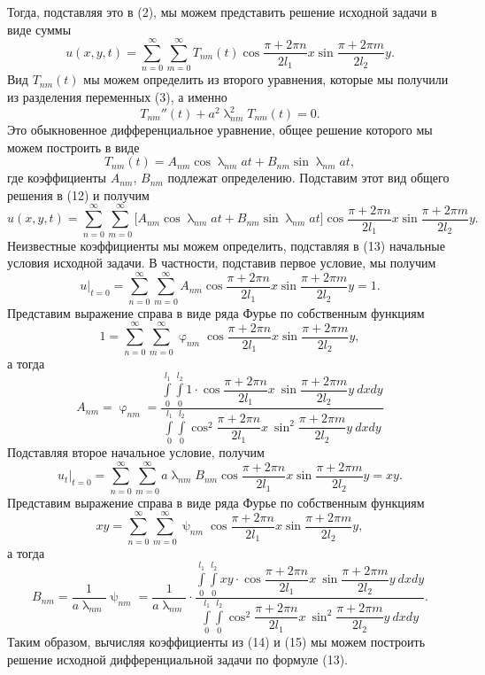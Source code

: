 \documentclass[a4paper, 12pt]{report}
\numberwithin{equation}{section}
\renewcommand{\varphi}{\upvarphi}
\renewcommand{\lambda}{\uplambda}
\renewcommand{\psi}{\uppsi}
\begin{document}
	Тогда, подставляя это в (2), мы можем представить решение исходной задачи в виде суммы
	\begin{equation}
		u(x,y,t) = \sum_{n=0}^{\infty}\sum_{m=0}^{\infty}T_{nm}(t)\cos \dfrac{\pi + 2\pi n}{2l_1}x\sin \dfrac{\pi + 2\pi m}{2l_2}y.
	\end{equation}
	Вид $T_{nm}(t)$ мы можем определить из второго уравнения, которые мы получили из разделения переменных (3), а именно
	$$T_{nm}''(t) + a^2 \lambda_{nm}^2 T_{nm}(t) = 0.$$
	Это обыкновенное дифференциальное уравнение, общее решение которого мы можем построить в виде
	$$T_{nm}(t) = A_{nm} \cos \lambda_{nm} a t + B_{nm}\sin \lambda_{nm} a t,$$
	где коэффициенты $A_{nm}$, $B_{nm}$ подлежат определению.
	Подставим этот вид общего решения в (12) и получим
	\begin{equation}
		u(x,y,t) = \sum_{n=0}^{\infty}\sum_{m=0}^{\infty}\Big[A_{nm} \cos \lambda_{nm} a t + B_{nm}\sin \lambda_{nm} a t\Big]\cos \dfrac{\pi + 2\pi n}{2l_1}x\sin \dfrac{\pi + 2\pi m}{2l_2}y.
	\end{equation}
	Неизвестные коэффициенты мы можем определить, подставляя в (13) начальные условия исходной задачи. В частности, подставив первое условие, мы получим
	$$u|_{t=0} = \sum_{n=0}^{\infty}\sum_{m=0}^{\infty} A_{nm}  \cos \dfrac{\pi + 2\pi n}{2l_1}x\sin \dfrac{\pi + 2\pi m}{2l_2}y = 1.$$
	Представим выражение справа в виде ряда Фурье по собственным функциям
	$$1 = \sum_{n=0}^{\infty}\sum_{m=0}^{\infty} \varphi_{nm}  \cos \dfrac{\pi + 2\pi n}{2l_1}x\sin \dfrac{\pi + 2\pi m}{2l_2}y,$$
	а тогда 
	\begin{equation}
		A_{nm} = \varphi_{nm} = \dfrac{\int\limits_0^{l_1}\int\limits_0^{l_2}1\cdot \cos \dfrac{\pi + 2\pi n}{2l_1}x\ \sin \dfrac{\pi + 2\pi m}{2l_2}y\ dxdy}{\int\limits_0^{l_1}\int\limits_0^{l_2}\cos^2 \dfrac{\pi + 2\pi n}{2l_1}x\ \sin^2 \dfrac{\pi + 2\pi m}{2l_2}y\ dxdy}
	\end{equation}
	Подставляя второе начальное условие, получим
	$$u_t|_{t=0} = \sum_{n=0}^{\infty}\sum_{m=0}^{\infty} a\lambda_{nm} B_{nm}  \cos \dfrac{\pi + 2\pi n}{2l_1}x\sin \dfrac{\pi + 2\pi m}{2l_2}y = xy.$$
	Представим выражение справа в виде ряда Фурье по собственным функциям
	$$xy = \sum_{n=0}^{\infty}\sum_{m=0}^{\infty} \psi_{nm}  \cos \dfrac{\pi + 2\pi n}{2l_1}x\sin \dfrac{\pi + 2\pi m}{2l_2}y,$$
	а тогда 
	\begin{equation}
		B_{nm} = \dfrac{1}{a\lambda_{nm}}\psi_{nm} =\dfrac{1}{a\lambda_{nm}}\cdot \dfrac{\int\limits_0^{l_1}\int\limits_0^{l_2}xy\cdot \cos \dfrac{\pi + 2\pi n}{2l_1}x\ \sin \dfrac{\pi + 2\pi m}{2l_2}y\ dxdy}{\int\limits_0^{l_1}\int\limits_0^{l_2}\cos^2 \dfrac{\pi + 2\pi n}{2l_1}x\ \sin^2 \dfrac{\pi + 2\pi m}{2l_2}y\ dxdy}.
	\end{equation}
	Таким образом, вычисляя коэффициенты из (14) и (15) мы можем построить решение исходной дифференциальной задачи по формуле (13).
\end{document}
